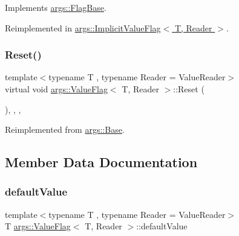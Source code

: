 Implements \hyperlink{classargs_1_1_flag_base_a3421d9a595c9426dc73f62604cdee84f}{args\+::\+Flag\+Base}.



Reimplemented in \hyperlink{classargs_1_1_implicit_value_flag_a4c3124a516ca870903c4788dce781292}{args\+::\+Implicit\+Value\+Flag$<$ T, Reader $>$}.

\mbox{\label{classargs_1_1_value_flag_a4300f5a4d96e46810767348d3758cc78}} 
\subsubsection{\texorpdfstring{Reset()}{Reset()}}
{\footnotesize\ttfamily template$<$typename T , typename Reader  = Value\+Reader$>$ \\
virtual void \hyperlink{classargs_1_1_value_flag}{args\+::\+Value\+Flag}$<$ T, Reader $>$\+::Reset (\begin{DoxyParamCaption}{ }\end{DoxyParamCaption})\hspace{0.3cm}{\ttfamily [inline]}, {\ttfamily [override]}, {\ttfamily [virtual]}, {\ttfamily [noexcept]}}



Reimplemented from \hyperlink{classargs_1_1_base_ac7cfc851174f71e00173121d3013dab1}{args\+::\+Base}.



\subsection{Member Data Documentation}
\mbox{\label{classargs_1_1_value_flag_a12282c45cbb677e08b789e860cd4e0f0}} 
\subsubsection{\texorpdfstring{default\+Value}{defaultValue}}
{\footnotesize\ttfamily template$<$typename T , typename Reader  = Value\+Reader$>$ \\
T \hyperlink{classargs_1_1_value_flag}{args\+::\+Value\+Flag}$<$ T, Reader $>$\+::default\+Value\hspace{0.3cm}{\ttfamily [protected]}}


